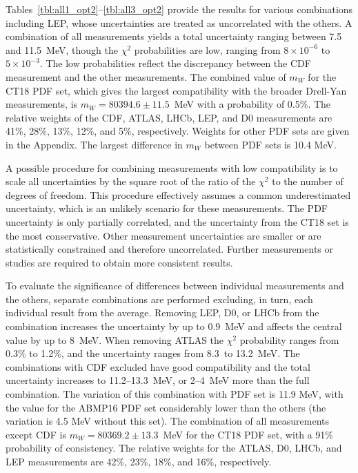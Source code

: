 Tables~\ref{tbl:all1_opt2}--\ref{tbl:all3_opt2} provide the results for various combinations including
LEP, whose uncertainties are treated as uncorrelated with the others.  A combination of all measurements
yields a total uncertainty ranging between 7.5 and 11.5~MeV, though the $\chi^2$ probabilities are low,
ranging from $8 \times 10^{-6}$ to $5\times 10^{-3}$.  The low probabilities
reflect the discrepancy between the CDF measurement and the other measurements. The combined value of
$m_W$ for the CT18 PDF set, which gives the largest compatibility with the broader Drell-Yan measurements,
is $m_W = 80394.6 \pm 11.5$~MeV with a probability of 0.5\%.  The relative weights of the CDF, ATLAS, LHCb,
LEP, and D0 measurements are 41\%, 28\%, 13\%, 12\%, and 5\%, respectively.  Weights for other PDF sets are
given in the Appendix.  The largest difference in $m_W$ between PDF sets is 10.4 MeV.

  

  

  

A possible procedure for combining measurements with low compatibility is to scale all uncertainties by the
square root of the ratio of the $\chi^2$ to the number of degrees of freedom.
This procedure effectively assumes a common underestimated uncertainty, which is an unlikely scenario for
these measurements.  The PDF uncertainty is only partially correlated, and the uncertainty from the CT18 set
is the most conservative.  Other measurement uncertainties are smaller or are statistically constrained and
therefore uncorrelated.  Further measurements or studies are required to obtain more consistent results.

To evaluate the significance of differences between individual measurements and the others, separate
combinations are performed excluding, in turn, each individual result from the average.
Removing LEP, D0, or LHCb from the combination increases the uncertainty by up to 0.9~MeV and affects
the central value by up to 8~MeV.
When removing ATLAS the
$\chi^2$ probability ranges from 0.3\% to 1.2\%, and the uncertainty ranges from 8.3~to 13.2~MeV.
The
combinations with CDF excluded have good compatibility and the total uncertainty increases to 11.2--13.3~MeV,
or 2--4~MeV more than the full combination.  The variation of this combination with PDF set is 11.9 MeV, with 
the value for the ABMP16 PDF set considerably lower than the others (the variation is 4.5 MeV without this set).
The combination of all measurements except CDF is $m_W=80369.2 \pm 13.3$~MeV for the CT18 PDF set, with a
91\% probability of consistency.  The relative weights for the ATLAS, D0, LHCb, and LEP measurements are 42\%,
23\%, 18\%, and 16\%, respectively.
 

